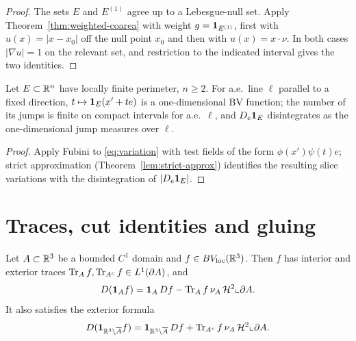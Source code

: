 \begin{proof}
The sets $E$ and $E^{(1)}$ agree up to a Lebesgue-null set.  Apply
Theorem~\ref{thm:weighted-coarea} with weight $g=\mathbf 1_{E^{(1)}}$, first with
$u(x)=|x-x_0|$ off the null point $x_0$ and then with $u(x)=x\cdot\nu$.
In both cases $|\nabla u|=1$ on the relevant set, and restriction to the
indicated interval gives the two identities.
\end{proof}

\begin{lemma}\label{lem:bv-slices}
Let $E\subset\mathbb R^n$ have locally finite perimeter, $n\ge2$.  For a.e.\ line $\ell$
parallel to a fixed direction, $t\mapsto\mathbf 1_{E}(x'+t e)$ is a
one-dimensional BV function; the number of its jumps is finite on compact
intervals for a.e.\ $\ell$, and
$D_e\mathbf 1_{E}$ disintegrates as the one-dimensional jump measures over $\ell$.
\end{lemma}

\begin{proof}
Apply Fubini to \eqref{eq:variation} with test fields of the form
$\phi(x')\psi(t)e$; strict approximation
(Theorem~\ref{lem:strict-approx}) identifies the resulting slice variations
with the disintegration of $|D_e\mathbf 1_{E}|$.
\end{proof}

\section{Traces, cut identities and gluing}\label{sec:traces}

\begin{theorem}\label{thm:traces}
Let $A\subset\mathbb R^3$ be a bounded $C^1$ domain and
$f\in BV_{\mathrm{loc}}(\mathbb R^3)$.  Then $f$ has interior and exterior traces
$\operatorname{Tr}_Af,\operatorname{Tr}_{A^c}f\in L^1(\partial A)$, and
\begin{equation}\label{eq:trace-product}
  D(\mathbf 1_{A}f)=\mathbf 1_{A}\,Df-\operatorname{Tr}_Af\,\nu_A\,\mathcal H^2\llcorner\partial A .
\end{equation}
It also satisfies the exterior formula
\begin{equation}\label{eq:trace-product-exterior}
  D(\mathbf 1_{\mathbb R^3\setminus\overline A}f)
  =\mathbf 1_{\mathbb R^3\setminus\overline A}\,Df
    +\operatorname{Tr}_{A^c}f\,\nu_A\,\mathcal H^2\llcorner\partial A .
\end{equation}
\end{theorem}

